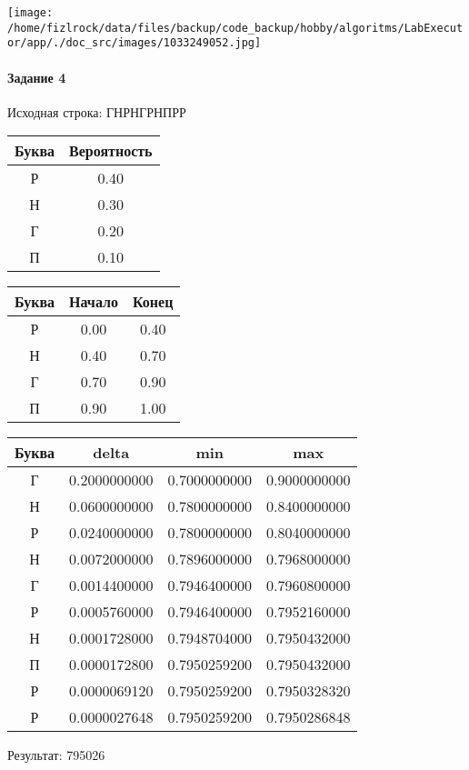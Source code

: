 \documentclass[a4paper, 12pt]{article}
\begin{document}
\texttt{[image: /home/fizlrock/data/files/backup/code\_backup/hobby/algoritms/LabExecutor/app/./doc\_src/images/1033249052.jpg]}
\paragraph{Задание 4}


Исходная строка: ГНРНГРНПРР

\begin{center}
 \begin{tabular}{ |c|c| } 
  \hline
     Буква & Вероятность \\ \hline
Р & 0.40\\\hline
Н & 0.30\\\hline
Г & 0.20\\\hline
П & 0.10
\\ \hline \end{tabular}
\end{center}
\begin{center}
 \begin{tabular}{ |c|c|c| } 
  \hline
     Буква & Начало & Конец \\ \hline
Р & 0.00 & 0.40\\\hline
Н & 0.40 & 0.70\\\hline
Г & 0.70 & 0.90\\\hline
П & 0.90 & 1.00
\\ \hline \end{tabular}
\end{center}
\begin{center}
 \begin{tabular}{ |c|c|c|c| } 
  \hline
     Буква & delta & min & max \\ \hline
Г & 0.2000000000 & 0.7000000000 & 0.9000000000\\\hline
Н & 0.0600000000 & 0.7800000000 & 0.8400000000\\\hline
Р & 0.0240000000 & 0.7800000000 & 0.8040000000\\\hline
Н & 0.0072000000 & 0.7896000000 & 0.7968000000\\\hline
Г & 0.0014400000 & 0.7946400000 & 0.7960800000\\\hline
Р & 0.0005760000 & 0.7946400000 & 0.7952160000\\\hline
Н & 0.0001728000 & 0.7948704000 & 0.7950432000\\\hline
П & 0.0000172800 & 0.7950259200 & 0.7950432000\\\hline
Р & 0.0000069120 & 0.7950259200 & 0.7950328320\\\hline
Р & 0.0000027648 & 0.7950259200 & 0.7950286848
\\ \hline \end{tabular}
\end{center}
Результат: 795026
\pagebreak
\end{document}
